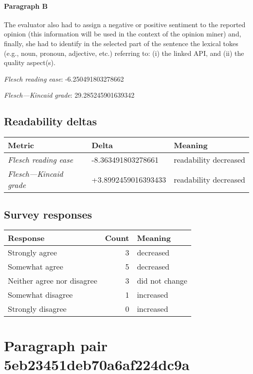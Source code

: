 \paragraph{Paragraph B}
The evaluator also had to assign a negative or positive sentiment to the reported opinion (this information will be used in the context of the opinion miner) and, finally, she had to identify in the selected part of the sentence the lexical tokes (e.g., noun, pronoun, adjective, etc.) referring to: (i) the linked API, and (ii) the quality aspect(s).\par\medskip\emph{Flesch reading ease}: -6.250491803278662\par\emph{Flesch---Kincaid grade}: 29.285245901639342

\subsection{Readability deltas}

\begin{tabular}{lll}
\toprule
               \textbf{Metric} &       \textbf{Delta} &       \textbf{Meaning} \\
\midrule
    \emph{Flesch reading ease} &   -8.363491803278661 &  readability decreased \\
 \emph{Flesch---Kincaid grade} &  +3.8992459016393433 &  readability decreased \\
\bottomrule
\end{tabular}

\subsection{Survey responses}
\begin{tabular}{lrl}
\toprule
          \textbf{Response} &  \textbf{Count} & \textbf{Meaning} \\
\midrule
             Strongly agree &               3 &        decreased \\
             Somewhat agree &               5 &        decreased \\
 Neither agree nor disagree &               3 &   did not change \\
          Somewhat disagree &               1 &        increased \\
          Strongly disagree &               0 &        increased \\
\bottomrule
\end{tabular}

\section{Paragraph pair 5eb23451deb70a6af224dc9a}

